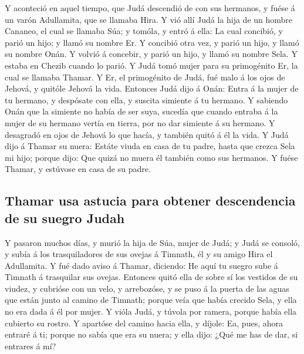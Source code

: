  Y aconteció en aquel tiempo, que Judá descendió de con
sus hermanos, y fuése á un varón Adullamita, que se llamaba Hira.
 Y vió allí Judá la hija de un hombre Cananeo, el cual se
llamaba Súa; y tomóla, y entró á ella:  La cual concibió,
y parió un hijo; y llamó su nombre Er.  Y concibió otra
vez, y parió un hijo, y llamó su nombre Onán.  Y volvió á
concebir, y parió un hijo, y llamó su nombre Sela. Y estaba en Chezib
cuando lo parió.  Y Judá tomó mujer para su primogénito
Er, la cual se llamaba Thamar.  Y Er, el primogénito de
Judá, fué malo á los ojos de Jehová, y quitóle Jehová la vida.
 Entonces Judá dijo á Onán: Entra á la mujer de tu
hermano, y despósate con ella, y suscita simiente á tu hermano.
 Y sabiendo Onán que la simiente no había de ser suya,
sucedía que cuando entraba á la mujer de su hermano vertía en tierra,
por no dar simiente á su hermano.  Y desagradó en ojos de
Jehová lo que hacía, y también quitó á él la vida.  Y
Judá dijo á Thamar su nuera: Estáte viuda en casa de tu padre, hasta que
crezca Sela mi hijo; porque dijo: Que quizá no muera él también como sus
hermanos. Y fuése Thamar, y estúvose en casa de su padre.

\hypertarget{thamar-usa-astucia-para-obtener-descendencia-de-su-suegro-judah}{%
\subsection{Thamar usa astucia para obtener descendencia de su suegro
Judah}\label{thamar-usa-astucia-para-obtener-descendencia-de-su-suegro-judah}}

 Y pasaron muchos días, y murió la hija de Súa, mujer de
Judá; y Judá se consoló, y subía á los trasquiladores de sus ovejas á
Timnath, él y su amigo Hira el Adullamita.  Y fué dado
aviso á Thamar, diciendo: He aquí tu suegro sube á Timnath á trasquilar
sus ovejas.  Entonces quitó ella de sobre sí los vestidos
de su viudez, y cubrióse con un velo, y arrebozóse, y se puso á la
puerta de las aguas que están junto al camino de Timnath; porque veía
que había crecido Sela, y ella no era dada á él por mujer.
 Y vióla Judá, y túvola por ramera, porque había ella
cubierto su rostro.  Y apartóse del camino hacia ella, y
díjole: Ea, pues, ahora entraré á ti; porque no sabía que era su nuera;
y ella dijo: ¿Qué me has de dar, si entrares á mí?

